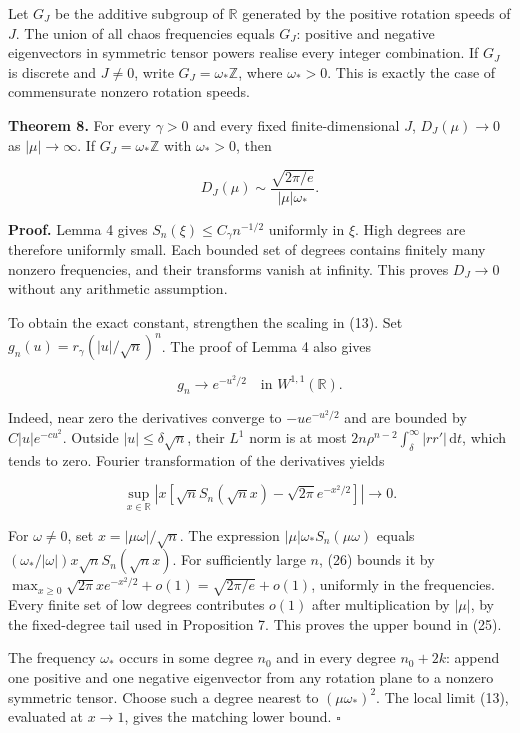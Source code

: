 \documentclass[
  british,
  11pt,
  a4paper,
]{article}
\begin{document}
Let \(G_J\) be the additive subgroup of \(\mathbb R\) generated by the
positive rotation speeds of \(J\). The union of all chaos frequencies
equals \(G_J\): positive and negative eigenvectors in symmetric tensor
powers realise every integer combination. If \(G_J\) is discrete and
\(J\ne0\), write \(G_J=\omega_*\mathbb Z\), where \(\omega_*>0\). This
is exactly the case of commensurate nonzero rotation speeds.

\textbf{Theorem 8.} For every \(\gamma>0\) and every fixed
finite-dimensional \(J\), \(D_J(\mu)\to0\) as \(|\mu|\to\infty\). If
\(G_J=\omega_*\mathbb Z\) with \(\omega_*>0\), then

\[
\boxed{\displaystyle
D_J(\mu)\sim\frac{\sqrt{2\pi/e}}{|\mu|\omega_*}.} \tag{25}
\]

\textbf{Proof.} Lemma 4 gives \(S_n(\xi)\le C_\gamma n^{-1/2}\)
uniformly in \(\xi\). High degrees are therefore uniformly small. Each
bounded set of degrees contains finitely many nonzero frequencies, and
their transforms vanish at infinity. This proves \(D_J\to0\) without any
arithmetic assumption.

To obtain the exact constant, strengthen the scaling in (13). Set
\(g_n(u)=r_\gamma(|u|/\sqrt n)^n\). The proof of Lemma 4 also gives

\[
g_n\longrightarrow e^{-u^2/2}\quad\text{in }W^{1,1}(\mathbb R).
\]

Indeed, near zero the derivatives converge to \(-u e^{-u^2/2}\) and are
bounded by \(C|u|e^{-cu^2}\). Outside \(|u|\le\delta\sqrt n\), their
\(L^1\) norm is at most
\(2n\rho^{n-2}\int_\delta^\infty|rr'|\,\mathrm dt\), which tends to
zero. Fourier transformation of the derivatives yields

\[
\sup_{x\in\mathbb R}\left|x\left[
\sqrt n S_n(\sqrt n x)-\sqrt{2\pi}e^{-x^2/2}
\right]\right|\longrightarrow0. \tag{26}
\]

For \(\omega\ne0\), set \(x=|\mu\omega|/\sqrt n\). The expression
\(|\mu|\omega_*S_n(\mu\omega)\) equals
\((\omega_*/|\omega|)x\sqrt n S_n(\sqrt n x)\). For sufficiently large
\(n\), (26) bounds it by
\(\max_{x\ge0}\sqrt{2\pi}x e^{-x^2/2}+o(1)=\sqrt{2\pi/e}+o(1)\),
uniformly in the frequencies. Every finite set of low degrees
contributes \(o(1)\) after multiplication by \(|\mu|\), by the
fixed-degree tail used in Proposition 7. This proves the upper bound in
(25).

The frequency \(\omega_*\) occurs in some degree \(n_0\) and in every
degree \(n_0+2k\): append one positive and one negative eigenvector from
any rotation plane to a nonzero symmetric tensor. Choose such a degree
nearest to \((\mu\omega_*)^2\). The local limit (13), evaluated at
\(x\to1\), gives the matching lower bound. \(\square\)
\end{document}
